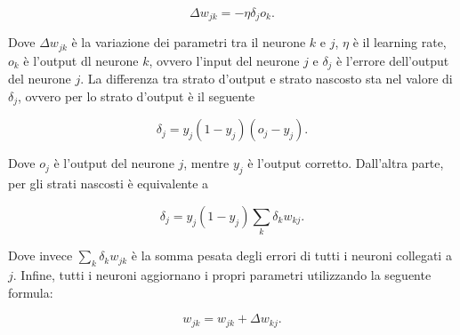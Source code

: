 \begin{equation}
\Delta w_{jk} = -\eta \delta _{j}o_{k}.
\end{equation}

Dove $\Delta w_{jk}$  è la variazione dei parametri tra il neurone $k$ e $j$, $\eta$ è il learning rate, $o_{k}$ è l'output dl neurone $k$, ovvero l'input del neurone $j$ e $\delta _{j}$ è l'errore dell'output del neurone $j$. La differenza tra strato d'output e strato nascosto sta nel valore di $\delta _{j}$, ovvero per lo strato d'output è il seguente

\begin{equation}
\delta _{j} = y_{j}(1-y_{j})(o_{j} - y_{j}).
\end{equation}

Dove $o_{j}$ è l'output del neurone $j$, mentre $y_{j}$ è l'output corretto.
Dall'altra parte, per gli strati nascosti è equivalente a 

\begin{equation}
\delta _{j} = y_{j}(1-y_{j})\sum_{k}\delta _{k}w_{kj}.    
\end{equation}

Dove invece $\sum_{k}\delta _{k}w_{jk}$ è la somma pesata degli errori di tutti i neuroni collegati a $j$. Infine, tutti i neuroni aggiornano i propri parametri utilizzando la seguente formula:

\begin{equation}
w_{jk} = w_{jk} + \Delta w_{kj}.
\end{equation}







